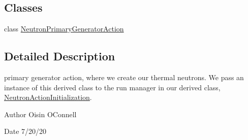 \subsection*{Classes}
\begin{DoxyCompactItemize}
\item 
class \hyperlink{classNeutronPrimaryGeneratorAction}{Neutron\+Primary\+Generator\+Action}
\end{DoxyCompactItemize}


\subsection{Detailed Description}
primary generator action, where we create our thermal neutrons. We pass an instance of this derived class to the run manager in our derived class, \hyperlink{classNeutronActionInitialization}{Neutron\+Action\+Initialization}. 

\begin{DoxyAuthor}{Author}
Oisin O\textquotesingle{}Connell
\end{DoxyAuthor}
\begin{DoxyDate}{Date}
7/20/20 
\end{DoxyDate}
